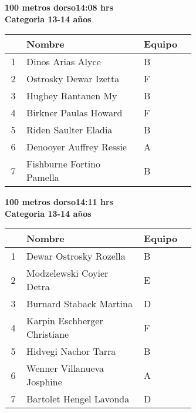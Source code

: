 \begin{minipage}{0.95\linewidth}\vspace{0.5cm} 
\begin{flushleft}
\textbf{
\hspace{-0.15cm}100 metros dorso\hspace{1.5cm}14:08 hrs \\Categoria 13-14 años}\vspace{-0.2cm} 
\end{flushleft}
\begin{tabular}{cp{0.63\linewidth}l}
\hline
& \textbf{Nombre} & \textbf{Equipo} \\ \hline
1 & Dinos Arias Alyce & B \\ 
2 & Ostrosky Dewar Izetta & F \\ 
3 & Hughey Rantanen My & B \\ 
4 & Birkner Paulas Howard & F \\ 
5 & Riden Saulter Eladia & B \\ 
6 & Denooyer Auffrey Ressie & A \\ 
7 & Fishburne Fortino Pamella & B \\ 
\end{tabular}
\end{minipage}
\begin{minipage}{0.95\linewidth}\vspace{0.5cm} 
\begin{flushleft}
\textbf{
\hspace{-0.15cm}100 metros dorso\hspace{1.5cm}14:11 hrs \\Categoria 13-14 años}\vspace{-0.2cm} 
\end{flushleft}
\begin{tabular}{cp{0.63\linewidth}l}
\hline
& \textbf{Nombre} & \textbf{Equipo} \\ \hline
1 & Dewar Ostrosky Rozella & B \\ 
2 & Modzelewski Coyier Detra & E \\ 
3 & Burnard Staback Martina & D \\ 
4 & Karpin Eschberger Christiane & F \\ 
5 & Hidvegi Nachor Tarra & B \\ 
6 & Wenner Villanueva Josphine & A \\ 
7 & Bartolet Hengel Lavonda & D \\ 
\end{tabular}
\end{minipage}
